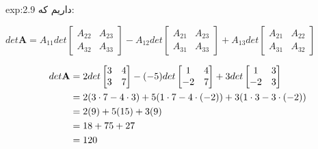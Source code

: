 {\begin{spacing}{1.3}
\begin{example}{exp:2.9}
            داریم که:

            $det\textbf{A}=A_{11}det\begin{bmatrix}
                                        A_{22} & A_{23} \\
                                        A_{32} & A_{33}
            \end{bmatrix}-A_{12}det\begin{bmatrix}
                                       A_{21} & A_{23} \\
                                       A_{31} & A_{33}
            \end{bmatrix}+A_{13}det\begin{bmatrix}
                                       A_{21} & A_{22} \\
                                       A_{31} & A_{32}
            \end{bmatrix}$

            \begin{equation*}
                \centering
                \begin{split}
                    det\textbf{A}&=2det\begin{bmatrix}
                                           3 & 4 \\
                                           3 & 7
                    \end{bmatrix}-(-5)det\begin{bmatrix}
                                             1  & 4 \\
                                             -2 & 7
                    \end{bmatrix}+3det\begin{bmatrix}
                                          1  & 3 \\
                                          -2 & 3
                    \end{bmatrix}\\
                    &=2(3\cdot 7-4\cdot 3)+5(1\cdot 7-4\cdot(-2))+3(1\cdot 3-3\cdot(-2)) \\
                    &=2(9)+5(15)+3(9) \\
                    &=18+75+27 \\
                    &=120
                \end{split}
            \end{equation*}
        \end{example}
    \end{spacing}
}


